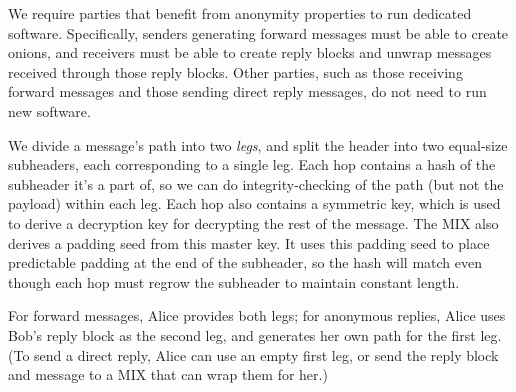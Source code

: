\documentclass{llncs}
\begin{document}
We require parties that benefit from anonymity properties to run dedicated
software.  Specifically, senders generating forward messages must be able
to create onions, and receivers must be able to create reply blocks
and unwrap messages received through those reply blocks. Other parties,
such as those receiving forward messages and those sending direct reply
messages, do not need to run new software.


We divide a message's path into two \emph{legs}, and split the header
into two equal-size subheaders, each corresponding to a single leg.
Each hop contains a hash of the subheader it's a part of, so we can do
integrity-checking of the path (but not the payload) within each leg.
Each hop also contains a symmetric key, which is used to derive a
decryption key for decrypting the rest of the message. The MIX also
derives a padding seed from this master key. It uses this padding seed
to place
predictable padding at the end of the subheader, so the hash will
match even though each hop must regrow the subheader to maintain
constant length.

For forward messages, Alice provides both legs; for anonymous replies, Alice
uses Bob's reply block as the second leg, and generates her own path
for the first leg.  (To send a direct reply, Alice can use an empty
first leg, or send the reply block and message to a MIX that can wrap
them for her.)
\end{document}
